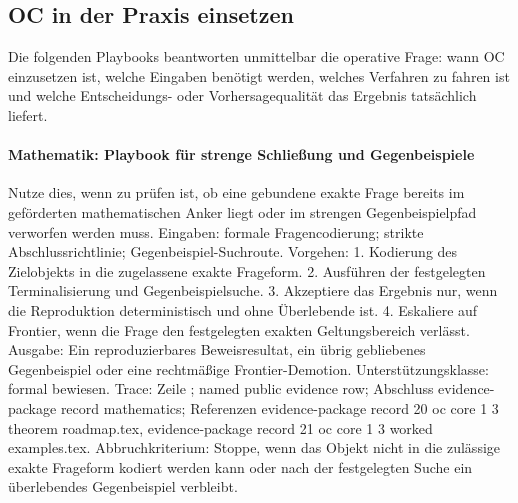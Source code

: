 \subsection{OC in der Praxis einsetzen}
Die folgenden Playbooks beantworten unmittelbar die operative Frage: wann OC einzusetzen ist, welche Eingaben benötigt werden, welches Verfahren zu fahren ist und welche Entscheidungs- oder Vorhersagequalität das Ergebnis tatsächlich liefert.

\paragraph{Mathematik: Playbook für strenge Schließung und Gegenbeispiele}
Nutze dies, wenn zu prüfen ist, ob eine gebundene exakte Frage bereits im geförderten mathematischen Anker liegt oder im strengen Gegenbeispielpfad verworfen werden muss.
Eingaben: formale Fragencodierung; \allowbreak strikte Abschlussrichtlinie; \allowbreak Gegenbeispiel-Suchroute.
Vorgehen: 1. Kodierung des Zielobjekts in die zugelassene exakte Frageform. 2. Ausführen der festgelegten Terminalisierung und Gegenbeispielsuche. 3. Akzeptiere das Ergebnis nur, wenn die Reproduktion deterministisch und ohne Überlebende ist. 4. Eskaliere auf Frontier, wenn die Frage den festgelegten exakten Geltungsbereich verlässt.
Ausgabe: Ein reproduzierbares Beweisresultat, ein übrig gebliebenes Gegenbeispiel oder eine rechtmäßige Frontier-Demotion.
Unterstützungsklasse: formal bewiesen.
Trace: Zeile ; named public evidence row; \allowbreak Abschluss evidence-package record mathematics; \allowbreak Referenzen evidence-package record 20 oc core 1 3 theorem roadmap.tex, \allowbreak evidence-package record 21 oc core 1 3 worked examples.tex.
Abbruchkriterium: Stoppe, wenn das Objekt nicht in die zulässige exakte Frageform kodiert werden kann oder nach der festgelegten Suche ein überlebendes Gegenbeispiel verbleibt.

